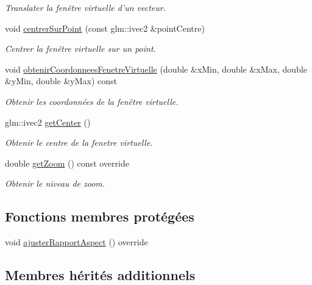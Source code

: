 \begin{DoxyCompactItemize}
\begin{DoxyCompactList}\small\item\em Translater la fenêtre virtuelle d'un vecteur. \end{DoxyCompactList}\item 
void \hyperlink{classvue_1_1_projection_ortho_a8f50a13c2cd734d7a2b58c9bb1e5b89d}{centrer\-Sur\-Point} (const glm\-::ivec2 \&point\-Centre)
\begin{DoxyCompactList}\small\item\em Centrer la fenêtre virtuelle sur un point. \end{DoxyCompactList}\item 
void \hyperlink{classvue_1_1_projection_ortho_a6e2fe7110bcaa89dd4b10ba59aa3e72b}{obtenir\-Coordonnees\-Fenetre\-Virtuelle} (double \&x\-Min, double \&x\-Max, double \&y\-Min, double \&y\-Max) const 
\begin{DoxyCompactList}\small\item\em Obtenir les coordonnées de la fenêtre virtuelle. \end{DoxyCompactList}\item 
glm\-::ivec2 \hyperlink{classvue_1_1_projection_ortho_a84f149bf5b3cf035fff242081d64d90f}{get\-Center} ()
\begin{DoxyCompactList}\small\item\em Obtenir le centre de la fenetre virtuelle. \end{DoxyCompactList}\item 
double \hyperlink{classvue_1_1_projection_ortho_a46a36b0e1525d6e7b6eead4834a85ac4}{get\-Zoom} () const override
\begin{DoxyCompactList}\small\item\em Obtenir le niveau de zoom. \end{DoxyCompactList}\end{DoxyCompactItemize}
\subsection*{Fonctions membres protégées}
\begin{DoxyCompactItemize}
\item 
void \hyperlink{classvue_1_1_projection_ortho_a4b1dcf9c2a487901edc1cee7dc3cce9a}{ajuster\-Rapport\-Aspect} () override
\end{DoxyCompactItemize}
\subsection*{Membres hérités additionnels}



